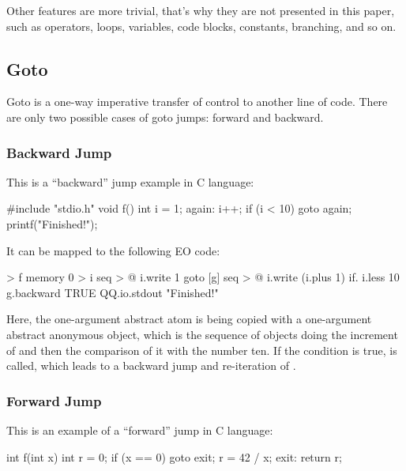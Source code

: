 \documentclass[sigplan,11pt,nonacm,natbib=false]{acmart}
\begin{document}
Other features are more trivial, that's why they are not presented in this paper, such as operators, loops, variables, code blocks, constants, branching, and so on.

\subsection{Goto}
\label{sec:goto}
 
Goto is a one-way imperative transfer of control to another line of code. There are only two possible cases of goto jumps: forward and backward. 

\subsubsection{Backward Jump}

This is a ``backward'' jump example in C language:

\begin{ffcode}
#include "stdio.h"
void f() {
  int i = 1;
  again:
  i++;
  if (i < 10) goto again;
  printf("Finished!");
}
\end{ffcode}

It can be mapped to the following EO code:

\begin{ffcode}
[] > f
  memory 0 > i
  seq > @
    i.write 1
    goto
      [g]
        seq > @
          i.write (i.plus 1)
          if.
            i.less 10
            g.backward
            TRUE
   QQ.io.stdout "Finished!"
\end{ffcode}

Here, the one-argument abstract atom  is being copied with a one-argument abstract anonymous object, which is the sequence of objects doing the increment of  and then the comparison of it with the number ten. If the condition is true,  is called, which leads to a backward jump and re-iteration of .

\subsubsection{Forward Jump}

This is an example of a ``forward'' jump in C language:

\begin{ffcode}
int f(int x) {
  int r = 0;
  if (x == 0) goto exit;
  r = 42 / x;
  exit:
  return r;
}
\end{ffcode}
\end{document}
